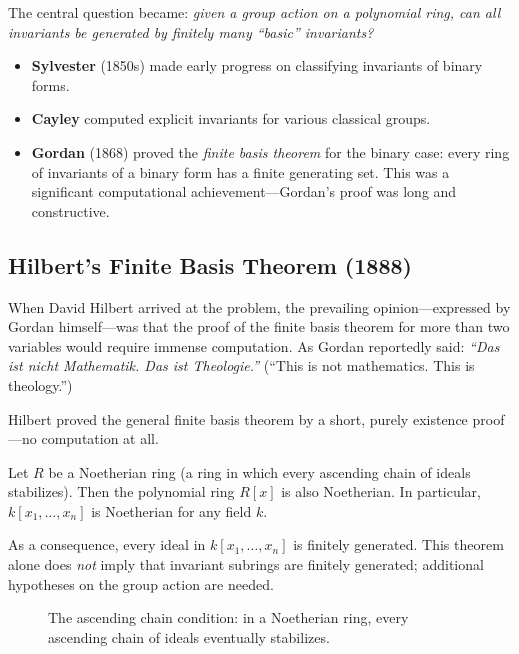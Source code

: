 The central question became: \emph{given a group action on a polynomial ring, can all invariants be generated by finitely many ``basic'' invariants?}

\begin{itemize}
    \item \textbf{Sylvester} (1850s) made early progress on classifying invariants of binary forms.
    \item \textbf{Cayley} computed explicit invariants for various classical groups.
    \item \textbf{Gordan} (1868) proved the \emph{finite basis theorem} for the binary case: every ring of invariants of a binary form has a finite generating set. This was a significant computational achievement---Gordan's proof was long and constructive.
\end{itemize}

\subsection{Hilbert's Finite Basis Theorem (1888)}

When David Hilbert arrived at the problem, the prevailing opinion---expressed by Gordan himself---was that the proof of the finite basis theorem for more than two variables would require immense computation. As Gordan reportedly said: \emph{``Das ist nicht Mathematik. Das ist Theologie.''} (``This is not mathematics. This is theology.'')

Hilbert proved the general finite basis theorem by a short, purely existence proof---no computation at all.

\begin{theorem}
\label{thm:hilbert-basis}
Let $R$ be a Noetherian ring (a ring in which every ascending chain of ideals stabilizes). Then the polynomial ring $R[x]$ is also Noetherian. In particular, $k[x_1, \ldots, x_n]$ is Noetherian for any field $k$.

As a consequence, every ideal in $k[x_1, \ldots, x_n]$ is finitely generated. This theorem alone does \emph{not} imply that invariant subrings are finitely generated; additional hypotheses on the group action are needed.
\end{theorem}

\begin{figure}[htbp]
\centering
{}
\caption{The ascending chain condition: in a Noetherian ring, every ascending chain of ideals eventually stabilizes.}
\label{fig:acc}
\end{figure}

